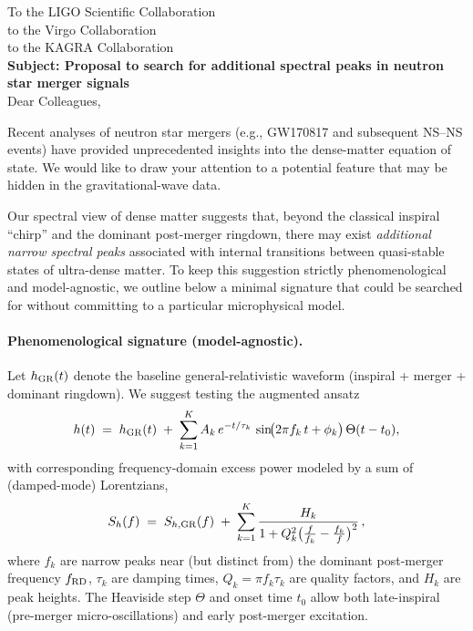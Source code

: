 \documentclass[a4paper,12pt]{article}
\begin{document}
\noindent
To the LIGO Scientific Collaboration \\
to the Virgo Collaboration \\
to the KAGRA Collaboration \\[2ex]

\noindent
\textbf{Subject: Proposal to search for additional spectral peaks in neutron star merger signals} \\[2ex]

Dear Colleagues,

Recent analyses of neutron star mergers (e.g., GW170817 and subsequent NS--NS events) have provided unprecedented insights into the dense-matter equation of state. We would like to draw your attention to a potential feature that may be hidden in the gravitational-wave data.

Our spectral view of dense matter suggests that, beyond the classical inspiral ``chirp'' and the dominant post-merger ringdown, there may exist \emph{additional narrow spectral peaks} associated with internal transitions between quasi-stable states of ultra-dense matter. To keep this suggestion strictly phenomenological and model-agnostic, we outline below a minimal signature that could be searched for without committing to a particular microphysical model.

\paragraph{Phenomenological signature (model-agnostic).}
Let $h_{\rm GR}(t)$ denote the baseline general-relativistic waveform (inspiral + merger + dominant ringdown). We suggest testing the augmented ansatz
\[
h(t) \;=\; h_{\rm GR}(t) \;+\; \sum_{k=1}^{K} A_k\, e^{-t/\tau_k}\,\sin\!\bigl(2\pi f_k\, t + \phi_k \bigr)\, \Theta(t-t_0),
\]
with corresponding frequency-domain excess power modeled by a sum of (damped-mode) Lorentzians,
\[
S_h(f) \;=\; S_{h,{\rm GR}}(f) \;+\; \sum_{k=1}^{K} \frac{H_k}{1 + Q_k^2 \bigl(\tfrac{f}{f_k} - \tfrac{f_k}{f}\bigr)^2}\,,
\]
where $f_k$ are narrow peaks near (but distinct from) the dominant post-merger frequency $f_{\rm RD}$, $\tau_k$ are damping times, $Q_k \!=\! \pi f_k \tau_k$ are quality factors, and $H_k$ are peak heights. The Heaviside step $\Theta$ and onset time $t_0$ allow both late-inspiral (pre-merger micro-oscillations) and early post-merger excitation.
\end{document}
